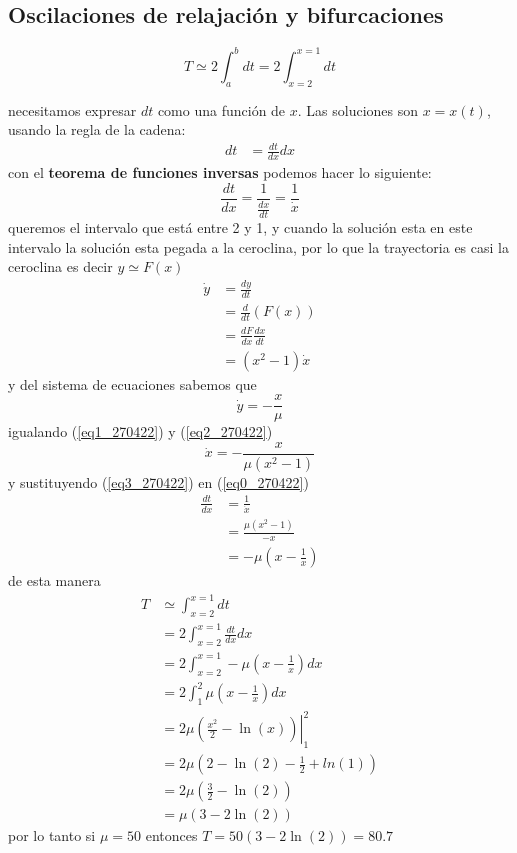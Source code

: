 \subsection{Oscilaciones de relajación y bifurcaciones}

\begin{equation*}
  T \simeq 2 \int_{a}^{b}   d{t} = 2 \int_{x=2}^{x=1}  {dt}   
\end{equation*}                  

necesitamos expresar $dt$ como una función de  $x$. Las soluciones son  $x=x(t)$, usando la regla de la cadena:
\begin{align*}
  dt &= \frac{dt}{dx} dx 
\end{align*}
con el \textbf{teorema de funciones inversas} podemos hacer lo siguiente:
\begin{equation} \label{eq0_270422} 
	\frac{dt}{dx} = \frac{1}{\frac{dx}{dt}} = \frac{1}{\dot{x}} 
\end{equation}
queremos el intervalo que está entre 2 y 1, y cuando la solución esta en este intervalo la solución esta pegada a la ceroclina, por lo que la trayectoria es casi la ceroclina es decir $y \simeq F(x)$
\begin{equation} \label{eq1_270422} 
	\begin{split}
		\dot{y} &= \frac{dy}{dt} \\
		 &= \frac{d}{dt} \left( F(x) \right) \\
		  &= \frac{dF}{dx} \frac{dx}{dt} \\
			&= (x^2-1) \dot{x} 
	\end{split}
\end{equation}
y del sistema de ecuaciones sabemos que \begin{equation}   \label{eq2_270422} 
  \dot{y} = -\frac{x}{\mu}
\end{equation}
igualando (\ref{eq1_270422}) y (\ref{eq2_270422}) 
\begin{equation}  \label{eq3_270422} 
  \dot{x} = -\frac{x}{\mu(x^2-1)}
\end{equation}
y sustituyendo (\ref{eq3_270422}) en (\ref{eq0_270422}) 
\begin{align*}
	\frac{dt}{dx} &= \frac{1}{\dot{x}} \\
	 &= \frac{\mu(x^2-1)}{-x} \\
	  &= -\mu \left( x-\frac{1}{x} \right)  
\end{align*}
de esta manera 
\begin{align*}
	T &\simeq \int_{x=2}^{x=1}  d{t} \\
	 &= 2 \int_{x=2}^{x=1} \frac{dt}{dx} d{x} \\
	  &= 2 \int_{x=2}^{x=1} -\mu \left( x-\frac{1}{x} \right)  d{x} \\
	   &= 2 \int_{1}^{2} \mu \left( x-\frac{1}{x} \right)  d{x} \\
	    &= 2\mu \left. \left( \frac{x^2}{2} - \ln(x) \right)   \right|_{1}^2         \\
	     &= 2\mu \left( 2-\ln(2)-\frac{1}{2}+ln(1) \right)  \\
	      &= 2\mu \left( \frac{3}{2} - \ln(2) \right) \\
	       &= \mu (3-2\ln(2)) 
\end{align*}
por lo tanto si $ \mu=50$ entonces $T = 50(3-2\ln(2)) = 80.7$
